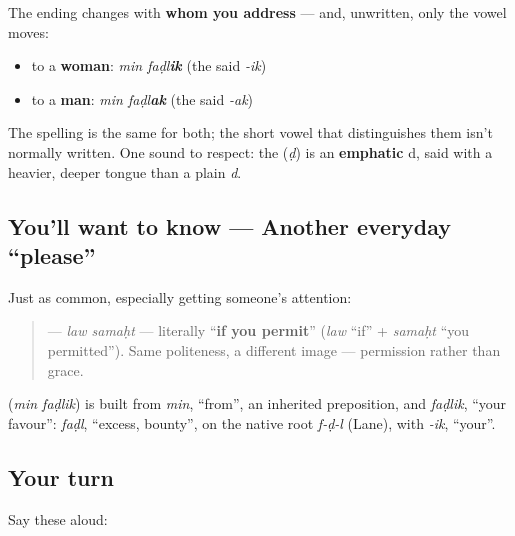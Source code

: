 \begin{grammarlens}[title={Grammar Lens — A gender note (Arabic marks \textquotedblleft{}you\textquotedblright{})}]
The ending changes with \textbf{whom you address} — and, unwritten, only the vowel moves:

\begin{itemize}
\raggedright
  \item to a \textbf{woman}: \emph{min faḍl\textbf{ik}} (the  said \emph{-ik})
  \item to a \textbf{man}: \emph{min faḍl\textbf{ak}} (the  said \emph{-ak})
\end{itemize}

The spelling \textbf{} is the same for both; the short vowel that distinguishes them isn't normally written. One sound to respect: the \textbf{} (\emph{ḍ}) is an \textbf{emphatic} d, said with a heavier, deeper tongue than a plain \emph{d}.
\end{grammarlens}

\subsection*{You'll want to know — Another everyday \textquotedblleft{}please\textquotedblright{}}
Just as common, especially getting someone's attention:

\begin{quote}
\textbf{ } — \emph{law samaḥt} — literally \textquotedblleft{}\textbf{if you permit}\textquotedblright{} (\emph{law} \textquotedblleft{}if\textquotedblright{} + \emph{samaḥt} \textquotedblleft{}you permitted\textquotedblright{}). Same politeness, a different image — permission rather than grace.
\end{quote}

\begin{cousinweb}
\textbf{ } (\emph{min faḍlik}) is built from \emph{min}, \textquotedblleft{}from\textquotedblright{}, an inherited preposition, and \emph{faḍlik}, \textquotedblleft{}your favour\textquotedblright{}: \emph{faḍl}, \textquotedblleft{}excess, bounty\textquotedblright{}, on the native root \emph{f-ḍ-l} (Lane), with \emph{-ik}, \textquotedblleft{}your\textquotedblright{}.
\end{cousinweb}

\subsection*{Your turn}
Say these aloud:

